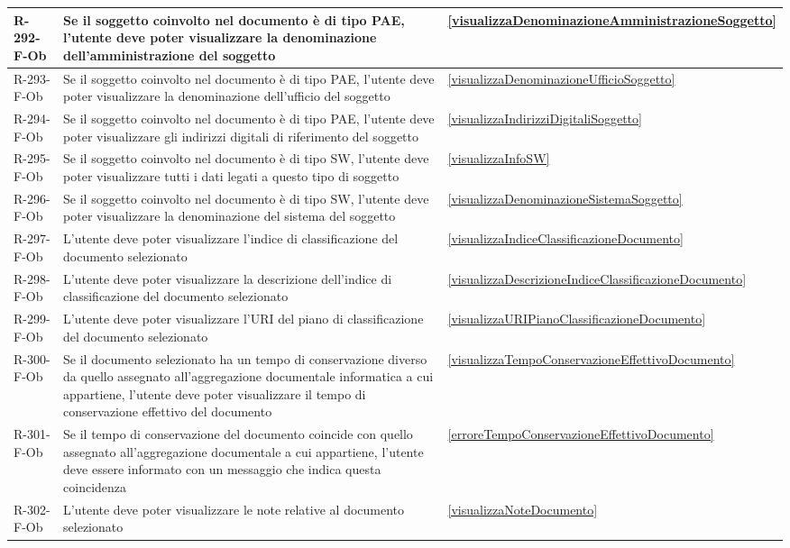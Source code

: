 \begin{longtable}{|p{2.5cm}|p{9.5cm}|p{2.5cm}|}
\hline
R-292-F-Ob & Se il soggetto coinvolto nel documento è di tipo PAE, l'utente deve poter visualizzare la denominazione dell'amministrazione del soggetto & \ref{visualizzaDenominazioneAmministrazioneSoggetto} \\
\hline
R-293-F-Ob & Se il soggetto coinvolto nel documento è di tipo PAE, l'utente deve poter visualizzare la denominazione dell'ufficio del soggetto & \ref{visualizzaDenominazioneUfficioSoggetto} \\
\hline
R-294-F-Ob & Se il soggetto coinvolto nel documento è di tipo PAE, l'utente deve poter visualizzare gli indirizzi digitali di riferimento del soggetto & \ref{visualizzaIndirizziDigitaliSoggetto} \\
\hline
R-295-F-Ob & Se il soggetto coinvolto nel documento è di tipo SW, l'utente deve poter visualizzare tutti i dati legati a questo tipo di soggetto & \ref{visualizzaInfoSW} \\
\hline
R-296-F-Ob & Se il soggetto coinvolto nel documento è di tipo SW, l'utente deve poter visualizzare la denominazione del sistema del soggetto & \ref{visualizzaDenominazioneSistemaSoggetto} \\
\hline
R-297-F-Ob & L'utente deve poter visualizzare l'indice di classificazione del documento selezionato & \ref{visualizzaIndiceClassificazioneDocumento} \\
\hline
R-298-F-Ob & L'utente deve poter visualizzare la descrizione dell'indice di classificazione del documento selezionato & \ref{visualizzaDescrizioneIndiceClassificazioneDocumento} \\
\hline
R-299-F-Ob & L'utente deve poter visualizzare l'URI del piano di classificazione del documento selezionato & \ref{visualizzaURIPianoClassificazioneDocumento} \\
\hline
R-300-F-Ob & Se il documento selezionato ha un tempo di conservazione diverso da quello assegnato all'aggregazione documentale informatica a cui appartiene, l'utente deve poter visualizzare il tempo di conservazione effettivo del documento & \ref{visualizzaTempoConservazioneEffettivoDocumento} \\
\hline
R-301-F-Ob & Se il tempo di conservazione del documento coincide con quello assegnato all'aggregazione documentale a cui appartiene, l'utente deve essere informato con un messaggio che indica questa coincidenza & \ref{erroreTempoConservazioneEffettivoDocumento} \\
\hline
R-302-F-Ob & L'utente deve poter visualizzare le note relative al documento selezionato & \ref{visualizzaNoteDocumento} \\

\end{longtable}
